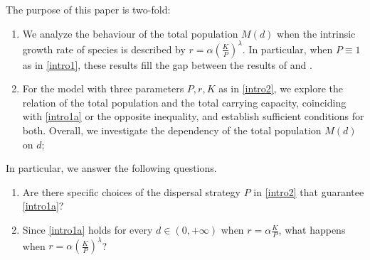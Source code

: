 \documentclass[11pt]{article}
\newcommand{\R}{\mathbb{R}}
\newcommand{\parentheses}[1]{\left(#1\right)}
\theoremstyle{definition}
\theoremstyle{remark}
\begin{document}


The purpose of this paper is two-fold:
\begin{enumerate}
\item
We analyze the behaviour of the total population $M(d)$ when the intrinsic growth rate of species is described by $r=\alpha\parentheses{\frac{K}{P}}^\lambda$.
In particular, when $P \equiv 1$ as in \eqref{intro1}, these results fill the gap between the results of \cite{Lou}  and \cite{Guo_2020}.
\item
For the model with three parameters $P,r,K$ as in \eqref{intro2}, we explore the relation of the total population and the total carrying capacity, coinciding with \eqref{intro1a}
or the opposite inequality, and establish sufficient conditions for both. Overall, we investigate  the dependency of the total  population $M(d)$ on $d$;
\end{enumerate}

In particular, we answer the following questions.

\begin{enumerate}
\item
Are there specific choices of the dispersal strategy $P$ in \eqref{intro2} that guarantee \eqref{intro1a}?
\item Since \eqref{intro1a} holds for every $d\in(0,+\infty)$ when $r=\alpha\frac{K}{P}$, what happens when $r=\alpha\parentheses{\frac{K}{P}}^\lambda$?

\end{enumerate}
\end{document}
